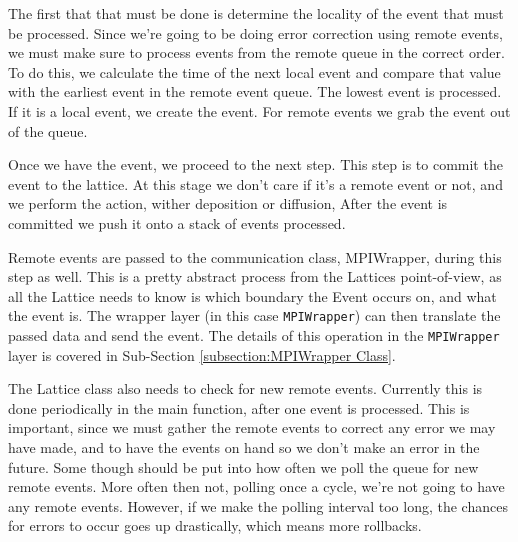 The first that that must be done is determine the locality of the event that must be processed.  Since we're going to be doing error correction using remote events, we must make sure to process events from the remote queue in the correct order.  To do this, we calculate the time of the next local event and compare that value with the earliest event in the remote event queue.  The lowest event is processed.  If it is a local event, we create the event.  For remote events we grab the event out of the queue.

Once we have the event, we proceed to the next step.  This step is to commit the event to the lattice.  At this stage we don't care if it's a remote event or not, and we perform the action, wither deposition or diffusion,  After the event is committed we push it onto a stack of events processed.

Remote events are passed to the communication class, MPIWrapper, during this step as well.  This is a pretty abstract process from the Lattices point-of-view, as all the Lattice needs to know is which boundary the Event occurs on, and what the event is.  The wrapper layer (in this case \texttt{MPIWrapper}) can then translate the passed data and send the event.  The details of this operation in the \texttt{MPIWrapper} layer is covered in Sub-Section \ref{subsection:MPIWrapper Class}.

The Lattice class also needs to check for new remote events.  Currently this is done periodically in the main function, after one event is processed.  This is important, since we must gather the remote events to correct any error we may have made, and to have the events on hand so we don't make an error in the future.  Some though should be put into how often we poll the queue for new remote events.  More often then not, polling once a cycle, we're not going to have any remote events.  However, if we make the polling interval too long, the chances for errors to occur goes up drastically, which means more rollbacks.

